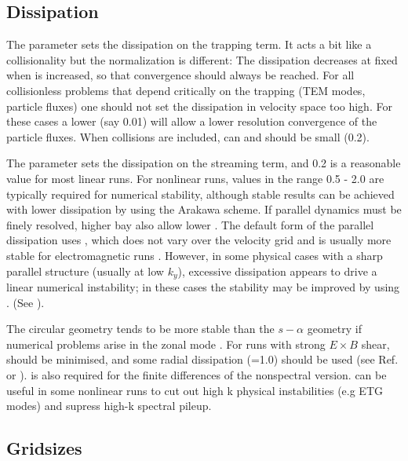 \subsection{Dissipation \label{sec.dissip}}

The parameter  sets the dissipation on the trapping term. 
It acts a bit like a collisionality but the normalization is different: The dissipation decreases at fixed 
when  is increased, so that convergence should always be reached.  For all collisionless problems
that depend critically on the trapping (TEM modes, particle fluxes) one should not set the dissipation in velocity space too high.
For these cases a lower  (say 0.01) will allow a lower resolution convergence of the particle fluxes.  
When collisions are included,  can and should be small (0.2).

The parameter  sets the dissipation on the streaming term, and 0.2 is a reasonable value for most linear runs.
For nonlinear runs, values in the range 0.5 - 2.0 are typically required for numerical stability, 
although stable results can be achieved with lower dissipation by using the Arakawa scheme.
If parallel dynamics must be finely resolved, higher  bay also allow lower .
The default form of the parallel dissipation uses , which does not vary over the velocity grid
and is usually more stable for electromagnetic runs .  However, 
in some physical cases with a sharp parallel structure (usually at low $k_y$),
excessive dissipation appears to drive a linear numerical instability;
in these cases the stability may be improved by using  . (See ).

The circular geometry tends to be more stable than the $s-\alpha$ geometry if numerical problems arise in the zonal mode \cite{CAS10}.
For runs with strong $E \times B$ shear,  should be minimised, and some radial dissipation (=1.0) should 
be used (see Ref. \cite{Casson-Thesis} or \cite{exb-dissip}).   is also required for the finite differences of the
nonspectral version.   can be useful in some nonlinear runs to cut out high k physical instabilities (e.g ETG modes) and 
supress high-k spectral pileup.

\subsection{Gridsizes}

